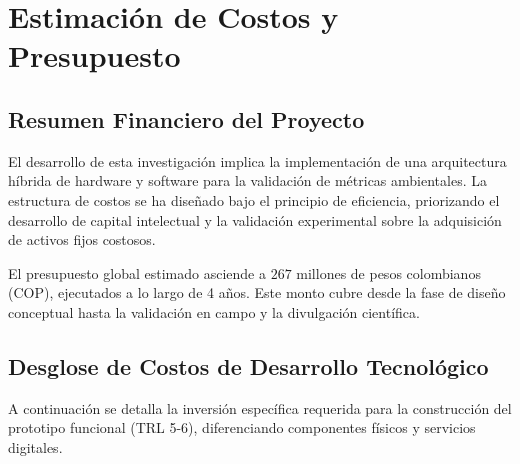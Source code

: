 \chapter{Estimación de Costos y Presupuesto}

\section{Resumen Financiero del Proyecto}
El desarrollo de esta investigación implica la implementación de una arquitectura híbrida de hardware y software para la validación de métricas ambientales. La estructura de costos se ha diseñado bajo el principio de eficiencia, priorizando el desarrollo de capital intelectual y la validación experimental sobre la adquisición de activos fijos costosos.

El presupuesto global estimado asciende a $267$ millones de pesos colombianos (COP), ejecutados a lo largo de 4 años. Este monto cubre desde la fase de diseño conceptual hasta la validación en campo y la divulgación científica.
\section{Desglose de Costos de Desarrollo Tecnológico}

A continuación se detalla la inversión específica requerida para la construcción del prototipo funcional (TRL 5-6), diferenciando componentes físicos y servicios digitales.

